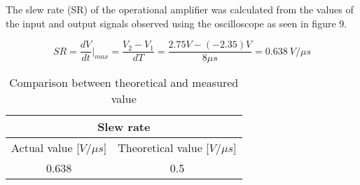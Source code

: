     The slew rate (SR) of the operational amplifier was calculated from the values of the input and output signals observed using the oscilloscope as seen in figure 9.

    $$SR = \dfrac{dV}{dt} \vert _{max} = \frac{V_2-V_1}{dT} = \frac{2.75V-(-2.35) V}{8\mu s} = 0.638 \ V/\mu s$$

    \begin{table}[htbp]
     \centering
       \begin{tabular}{c|c}
        \multicolumn{2}{c}{Slew rate}\\
        \hline
        Actual value [$V/\mu s$] & Theoretical value [$V/\mu s$] \\
       \hline
        0.638          & 0.5 \\
       \end{tabular}%
     \caption{Comparison between theoretical and measured value}
     \label{tab:addlabel}%
   \end{table}%